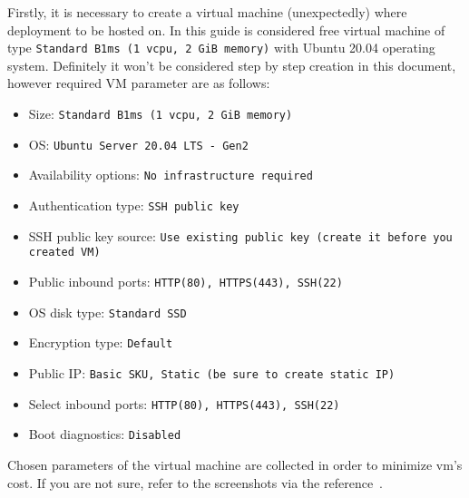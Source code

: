 Firstly, it is necessary to create a virtual machine (unexpectedly) where deployment to be hosted on.
In this guide is considered free virtual machine of type \texttt{Standard B1ms (1 vcpu, 2 GiB memory)}
with Ubuntu 20.04 operating system.
Definitely it won't be considered step by step creation in this document, however required VM parameter are as follows:
\begin{itemize}
    \item Size: \texttt{Standard B1ms (1 vcpu, 2 GiB memory)}
    \item OS: \texttt{Ubuntu Server 20.04 LTS - Gen2}
    \item Availability options: \texttt{No infrastructure required}
    \item Authentication type: \texttt{SSH public key}
    \item SSH public key source: \texttt{Use existing public key (create it before you created VM)}
    \item Public inbound ports: \texttt{HTTP(80), HTTPS(443), SSH(22)}
    \item OS disk type: \texttt{Standard SSD}
    \item Encryption type: \texttt{Default}
    \item Public IP: \texttt{Basic SKU, Static (be sure to create static IP)}
    \item Select inbound ports: \texttt{HTTP(80), HTTPS(443), SSH(22)}
    \item Boot diagnostics: \texttt{Disabled}
\end{itemize}
Chosen parameters of the virtual machine are collected in order to minimize vm's cost.
If you are not sure, refer to the screenshots via the reference~\cite{Create_Vm_Screens}.